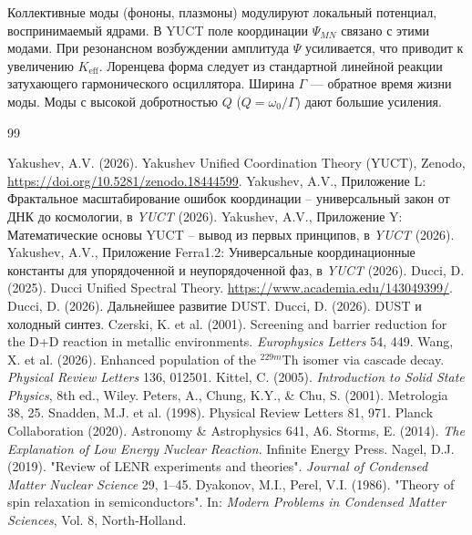 \documentclass[12pt]{article}
\theoremstyle{remark}
\newcommand{\Keff}{K_{\mathrm{eff}}}
\begin{document}
	Коллективные моды (фононы, плазмоны) модулируют локальный потенциал, воспринимаемый ядрами. В YUCT поле координации \(\Psi_{MN}\) связано с этими модами. При резонансном возбуждении амплитуда \(\Psi\) усиливается, что приводит к увеличению \(\Keff\). Лоренцева форма следует из стандартной линейной реакции затухающего гармонического осциллятора. Ширина \(\Gamma\) — обратное время жизни моды. Моды с высокой добротностью \(Q\) (\(Q = \omega_0/\Gamma\)) дают большие усиления.
	
	\begin{thebibliography}{99}
		
		 Yakushev, A.V. (2026). Yakushev Unified Coordination Theory (YUCT), Zenodo, \url{https://doi.org/10.5281/zenodo.18444599}.
		 Yakushev, A.V., Приложение L: Фрактальное масштабирование ошибок координации – универсальный закон от ДНК до космологии, в \emph{YUCT} (2026).
		 Yakushev, A.V., Приложение Y: Математические основы YUCT – вывод из первых принципов, в \emph{YUCT} (2026).
		 Yakushev, A.V., Приложение Ferra1.2: Универсальные координационные константы для упорядоченной и неупорядоченной фаз, в \emph{YUCT} (2026).
		 Ducci, D. (2025). Ducci Unified Spectral Theory. \url{https://www.academia.edu/143049399/}.
		 Ducci, D. (2026). Дальнейшее развитие DUST.
		 Ducci, D. (2026). DUST и холодный синтез.
		 Czerski, K. et al. (2001). Screening and barrier reduction for the D+D reaction in metallic environments. \textit{Europhysics Letters} 54, 449.
		 Wang, X. et al. (2026). Enhanced population of the \(^{229m}\)Th isomer via cascade decay. \textit{Physical Review Letters} 136, 012501.
		 Kittel, C. (2005). \textit{Introduction to Solid State Physics}, 8th ed., Wiley.
		 Peters, A., Chung, K.Y., \& Chu, S. (2001). Metrologia 38, 25.
		 Snadden, M.J. et al. (1998). Physical Review Letters 81, 971.
		 Planck Collaboration (2020). Astronomy \& Astrophysics 641, A6.
		 Storms, E. (2014). \textit{The Explanation of Low Energy Nuclear Reaction}. Infinite Energy Press.
		 Nagel, D.J. (2019). "Review of LENR experiments and theories". \textit{Journal of Condensed Matter Nuclear Science} 29, 1–45.
		 Dyakonov, M.I., Perel, V.I. (1986). "Theory of spin relaxation in semiconductors". In: \textit{Modern Problems in Condensed Matter Sciences}, Vol. 8, North‑Holland.

\end{thebibliography}
\end{document}
